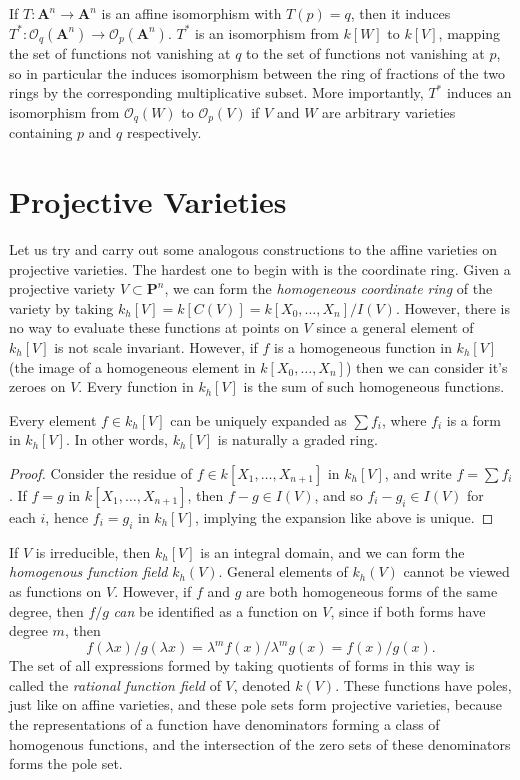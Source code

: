 If $T: \mathbf{A}^n \to \mathbf{A}^n$ is an affine isomorphism with $T(p) = q$, then it induces $T^*: \mathcal{O}_q(\mathbf{A}^n) \to \mathcal{O}_p(\mathbf{A}^n)$. $T^*$ is an isomorphism from $k[W]$ to $k[V]$, mapping the set of functions not vanishing at $q$ to the set of functions not vanishing at $p$, so in particular the induces isomorphism between the ring of fractions of the two rings by the corresponding multiplicative subset. More importantly, $T^*$ induces an isomorphism from $\mathcal{O}_q(W)$ to $\mathcal{O}_p(V)$ if $V$ and $W$ are arbitrary varieties containing $p$ and $q$ respectively.

\section{Projective Varieties}

Let us try and carry out some analogous constructions to the affine varieties on projective varieties. The hardest one to begin with is the coordinate ring. Given a projective variety $V \subset \mathbf{P}^n$, we can form the \emph{homogeneous coordinate ring} of the variety by taking $k_h[V] = k[C(V)] = k[X_0,\dots,X_n]/I(V)$. However, there is no way to evaluate these functions at points on $V$ since a general element of $k_h[V]$ is not scale invariant. However, if $f$ is a homogeneous function in $k_h[V]$ (the image of a homogeneous element in $k[X_0,\dots,X_n]$) then we can consider it's zeroes on $V$. Every function in $k_h[V]$ is the sum of such homogeneous functions.

\begin{prop}
    Every element $f \in k_h[V]$ can be uniquely expanded as $\sum f_i$, where $f_i$ is a form in $k_h[V]$. In other words, $k_h[V]$ is naturally a graded ring.
\end{prop}
\begin{proof}
    Consider the residue of $f \in k[X_1, \dots, X_{n+1}]$ in $k_h[V]$, and write $f = \sum f_i$. If $f = g$ in $k[X_1, \dots, X_{n+1}]$, then $f - g \in I(V)$, and so $f_i - g_i \in I(V)$ for each $i$, hence $f_i = g_i$ in $k_h[V]$, implying the expansion like above is unique.
\end{proof}


If $V$ is irreducible, then $k_h[V]$ is an integral domain, and we can form the \emph{homogenous function field} $k_h(V)$. General elements of $k_h(V)$ cannot be viewed as functions on $V$. However, if $f$ and $g$ are both homogeneous forms of the same degree, then $f/g$ \emph{can} be identified as a function on $V$, since if both forms have degree $m$, then
%
\[ f(\lambda x)/g(\lambda x) = \lambda^m f(x) / \lambda^m g(x) = f(x)/g(x). \]
%
The set of all expressions formed by taking quotients of forms in this way is called the \emph{rational function field} of $V$, denoted $k(V)$. These functions have poles, just like on affine varieties, and these pole sets form projective varieties, because the representations of a function have denominators forming a class of homogenous functions, and the intersection of the zero sets of these denominators forms the pole set.

